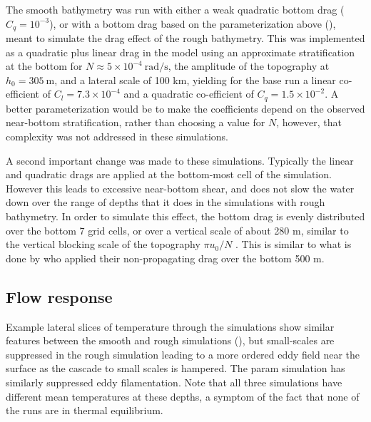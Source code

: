 \documentclass[twocol]{ametsocV5}
\newcommand{\tempS}[1]{}
\begin{document}
The smooth bathymetry was run with either a weak quadratic bottom drag ($C_q = 10^{-3}$), or with a bottom drag based on the parameterization above (), meant to simulate the drag effect of the rough bathymetry. This was implemented as a quadratic plus linear drag in the model using an approximate stratification at the bottom for $N\approx 5\times10^{-4}\ \mathrm{rad / s}$, the amplitude of the topography at $h_0 = 305\ \mathrm{m}$, and a lateral scale of 100 km, yielding for the base run a linear co-efficient of $C_l = 7.3\times 10^{-4}$ and a quadratic co-efficient of $C_q = 1.5\times 10^{-2}$.    A better parameterization would be to make the coefficients depend on the observed near-bottom stratification, rather than choosing a value for $N$, however, that complexity was not addressed in these simulations.  

A second important change was made to these simulations.  Typically the linear and quadratic drags are applied at the bottom-most cell of the simulation.  However this leads to excessive near-bottom shear, and does not slow the water down over the range of depths that it does in the simulations with rough bathymetry.  In order to simulate this effect, the bottom drag is evenly distributed over the bottom 7 grid cells, or over a vertical scale of about 280 m, similar to the vertical blocking scale of the topography $\pi u_0/N$ \citep{klymaketal10a}.  This is similar to what is done by \citet{trossmanetal2016} who applied their non-propagating drag over the bottom 500 m.  

\subsection{Flow response}

Example lateral slices of temperature through the simulations show similar features between the {\sc smooth} and {\sc rough} simulations (), but small-scales are suppressed in the {\sc rough} simulation leading to a more ordered eddy field near the surface as the cascade to small scales is hampered. The {\sc param} simulation has similarly suppressed eddy filamentation.  Note that all three simulations have different mean temperatures at these depths, a symptom of the fact that none of the runs are in thermal equilibrium.  
\end{document}
